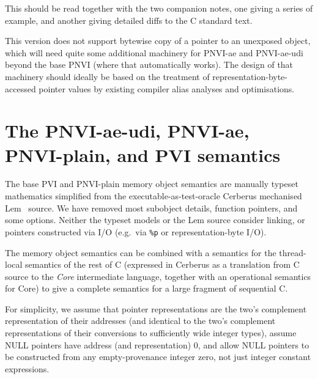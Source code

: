 \documentclass[acmsmall,review,screen]{acmart}\settopmatter{printfolios=true,printccs=false,printacmref=false}
\begin{document}
This should be read together with the two companion notes, one giving 
a series of example, and another giving detailed diffs to the
C standard text. 



{\color{red}This version does not support bytewise copy of a pointer
 to an unexposed object, which will need quite some additional
 machinery for PNVI-ae and PNVI-ae-udi beyond the base PNVI (where
 that automatically works).  The design of that machinery should
 ideally be based on the treatment of representation-byte-accessed
 pointer values by existing compiler alias analyses and optimisations.}



\section{The PNVI-ae-udi, PNVI-ae, PNVI-plain, and PVI semantics}

The base PVI and PNVI-plain memory object semantics are manually typeset mathematics simplified from the
executable-as-test-oracle
Cerberus
mechanised Lem~\cite{Lem-icfp2014} source. We have removed most subobject details, function
pointers, and some options.  Neither the typeset models or
the Lem source consider linking, or pointers constructed via I/O
(e.g.~via
\texttt{\%p} or representation-byte I/O).

The memory object semantics can be combined with a semantics for the
thread-local semantics of the rest of C (expressed in Cerberus as a
translation from C source to the \emph{Core} intermediate language,
together with an operational semantics for Core) to give a complete
semantics for a large fragment of sequential C. 


For simplicity, we assume that pointer representations are the two's complement
representation of their addresses (and identical to the two's
complement representations of their conversions to sufficiently wide
integer types), assume NULL pointers have
address (and representation) $0$, and allow NULL pointers to be constructed from any
empty-provenance integer zero, not just integer constant expressions.
\end{document}
